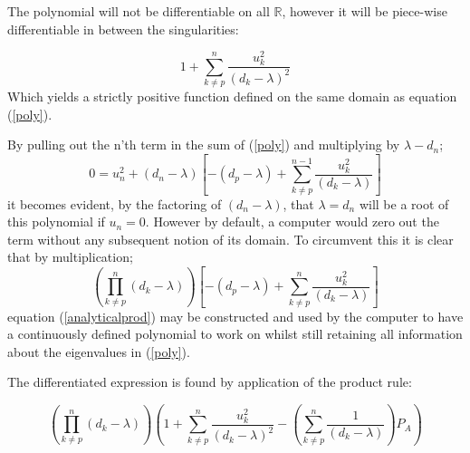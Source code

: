 \documentclass{article}
\begin{document}
The polynomial will not be differentiable on all $\mathbb{R}$, however it will be piece-wise differentiable in between the singularities:

\begin{equation}
1+\sum_{k \neq p}^{n}\frac{u_{k}^{2}}{{\left(d_{k}-\lambda\right)}^{2}}
\label{omskriv}
\end{equation}
Which yields a strictly positive function defined on the same domain as equation (\ref{poly}).

By pulling out the n'th term in the sum of (\ref{poly}) and multiplying by $\lambda-d_{n}$;
\begin{equation}
0=u_{n}^{2}+(d_{n}-\lambda)\left[-\left(d_{p}-\lambda\right)+\sum_{k \neq p}^{n-1}\frac{u_{k}^{2}}{\left(d_{k}-\lambda\right)}\right]
\label{pullingout}
\end{equation}
it becomes evident, by the factoring of $\left(d_{n}-\lambda\right)$, that $\lambda=d_{n}$ will be a root of this polynomial if $u_{n}=0$. However by default, a computer would zero out the term without any subsequent notion of its domain. To circumvent this it is clear that by multiplication;
\begin{equation}
\left(\prod_{k\neq p}^{n} (d_{k}-\lambda)\right)\left[-\left(d_{p}-\lambda\right)+\sum_{k \neq p}^{n}\frac{u_{k}^{2}}{\left(d_{k}-\lambda\right)}\right]
\label{analyticalprod}
\end{equation}
equation (\ref{analyticalprod}) may be constructed and used by the computer to have a continuously defined polynomial to work on whilst still retaining all information about the eigenvalues in (\ref{poly}).


The differentiated expression is found by application of the product rule:

\begin{equation}
\left(\prod_{k \neq p}^{n} (d_{k}-\lambda)\right)\left(1+\sum_{k \neq p}^{n}\frac{u_{k}^{2}}{{\left(d_{k}-\lambda\right)}^{2}}-\left(\sum_{k \neq p}^{n}\frac{1}{\left(d_{k}-\lambda\right)}\right)P_{A}\right)
\label{derivprod}
\end{equation}
\end{document}
